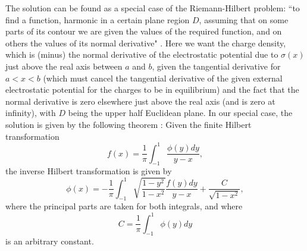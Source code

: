 \documentclass[12pt]{article}
\begin{document}
The solution can be found  as a special case of the Riemann-Hilbert
problem:
``to find a function, harmonic in a certain plane region $D$,
assuming that on
some parts of its contour we are given the values of the required
function, and
on others the values of its normal derivative" \cite{Mik}.  Here we
want the
charge density, which is (minus) the normal derivative of the
electrostatic
potential due to $\sigma(x)$ just above the real axis between $a$ and
$b$,
given the tangential derivative for $a<x<b$ (which must cancel the
tangential
derivative of the given external electrostatic potential for the
charges to be
in equilibrium) and the fact that the normal derivative is zero
elsewhere just
above the real axis (and is zero at infinity), with $D$ being the
upper half
Euclidean plane.  In our special case, the solution is given by the
following
theorem \cite{Tri1,Tri2}:  Given the finite Hilbert transformation
	\begin{equation}
        f(x) = \frac{1}{\pi}\int _{-1}^{1}\frac{\phi(y)dy}{y-x},
	\end{equation}
the inverse Hilbert transformation is given by
	\begin{equation}
        \phi(x) = -\frac{1}{\pi}\int _{-1}^{1}
	\sqrt{\frac{1-y^2}{1-x^2}}\frac{f(y)dy}{y-x}
	+\frac{C}{\sqrt{1-x^2}},
	\end{equation}
where the principal parts are taken for both integrals, and where
	\begin{equation}
        C = \frac{1}{\pi}\int _{-1}^{1}\phi(y)dy
	\end{equation}
is an arbitrary constant.
\end{document}
